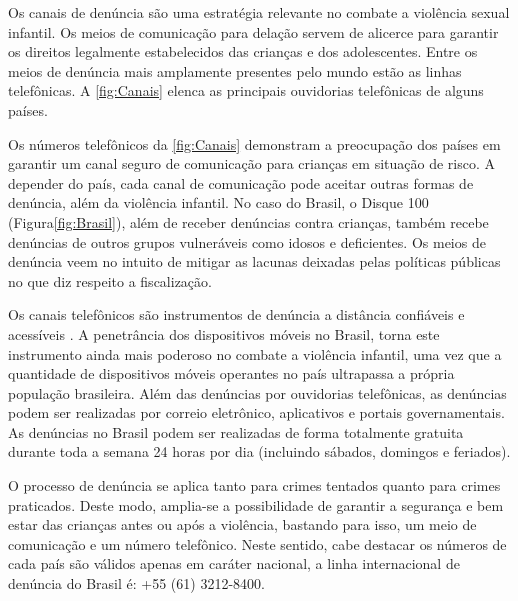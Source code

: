 
Os canais de denúncia são uma estratégia relevante no combate a violência sexual infantil. Os meios de comunicação para delação servem de alicerce para garantir os direitos legalmente estabelecidos das crianças e dos adolescentes. Entre os meios de denúncia mais amplamente presentes pelo mundo estão as linhas telefônicas. A \autoref{fig:Canais} elenca as principais ouvidorias telefônicas de alguns países.


Os números telefônicos da \autoref{fig:Canais} demonstram a preocupação dos países em garantir um canal seguro de comunicação para crianças em situação de risco. A depender do país, cada canal de comunicação pode aceitar outras formas de denúncia, além da violência infantil. No caso do Brasil, o Disque 100 (Figura\autoref{fig:Brasil}), além de receber denúncias contra crianças, também recebe denúncias de outros grupos vulneráveis como idosos e deficientes. Os meios de denúncia veem no intuito de mitigar as lacunas deixadas pelas políticas públicas no que diz respeito a fiscalização.

Os canais telefônicos são instrumentos de denúncia a distância confiáveis e acessíveis \cite{linhas2017}. A penetrância dos dispositivos móveis no Brasil, torna este instrumento ainda mais poderoso no combate a violência infantil, uma vez que a quantidade de dispositivos móveis operantes no país ultrapassa a própria população brasileira. Além das denúncias por ouvidorias telefônicas, as denúncias podem ser realizadas por correio eletrônico, aplicativos e portais governamentais. As denúncias no Brasil podem ser realizadas de forma totalmente gratuita durante toda a semana 24 horas por dia (incluindo sábados, domingos e feriados).

O processo de denúncia se aplica tanto para crimes tentados quanto para crimes praticados. Deste modo, amplia-se a possibilidade de garantir a segurança e bem estar das crianças antes ou após a violência, bastando para isso, um meio de comunicação e um número telefônico. Neste sentido, cabe destacar os números de cada país são válidos apenas em caráter nacional, a linha internacional de denúncia do Brasil é: +55 (61) 3212-8400.



